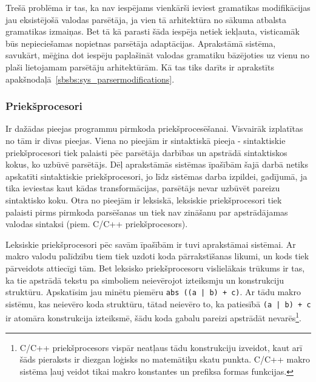 Trešā problēma ir tas, ka nav iespējams vienkārši ieviest gramatikas modifikācijas jau eksistējošā valodas parsētāja, ja vien tā arhitektūra no sākuma atbalsta gramatikas izmaiņas. Bet tā kā parasti šāda iespēja netiek iekļauta, visticamāk būs nepieciešamas nopietnas parsētāja adaptācijas. Aprakstāmā sistēma, savukārt, mēģina dot iespēju paplašināt valodas gramatiku bāzējoties uz vienu no plaši lietojamam parsētāju arhitektūrām. Kā tas tiks darīts ir aprakstīts apakšnodaļā~\ref{sbsbs:sys_parsermodifications}.


\subsubsection{\label{sbsbs:sys_texttransform}Priekšprocesori}

Ir dažādas pieejas programmu pirmkoda priekšprocesēšanai. Visvairāk izplatītas no tām ir divas pieejas. Viena no pieejām ir sintaktiskā pieeja - sintaktiskie priekšprocesori tiek palaisti pēc parsētāja darbības un apstrādā sintaktiskos kokus, ko uzbūvē parsētājs. Dēļ aprakstāmās sistēmas īpašībām šajā darbā netiks apskatīti sintaktiskie priekšprocesori, jo līdz sistēmas darba izpildei, gadījumā, ja tika ieviestas kaut kādas transformācijas, parsētājs nevar uzbūvēt pareizu sintaktisko koku. Otra no pieejām ir leksiskā, leksiskie priekšprocesori tiek palaisti pirms pirmkoda parsēšanas un tiek nav zināšanu par apstrādājamas valodas sintaksi (piem. C/C++ priekšprocesors).


Leksiskie priekšprocesori pēc savām īpašībām ir tuvi aprakstāmai sistēmai. Ar makro valodu palīdzību tiem tiek uzdoti koda pārrakstīšanas likumi, un kods tiek pārveidots attiecīgi tām. Bet leksisko priekšprocesoru vislielākais trūkums ir tas, ka tie apstrādā tekstu pa simboliem neievērojot izteiksmju un konstrukciju struktūru. Apskatīsim jau minētu piemēru \verb/abs ((a | b) + c)/. Ar tādu makro sistēmu, kas neievēro koda struktūru, tātad neievēro to, ka patiesībā \verb/(a | b) + c/ ir atomāra konstrukcija izteiksmē, šādu koda gabalu pareizi apstrādāt nevarēs\footnote{C/C++ priekšprocesors vispār neatļaus tādu konstrukciju izveidot, kaut arī šāds pieraksts ir diezgan loģisks no matemātiķu skatu punkta. C/C++ makro sistēma ļauj veidot tikai makro konstantes un prefiksa formas funkcijas.}.


